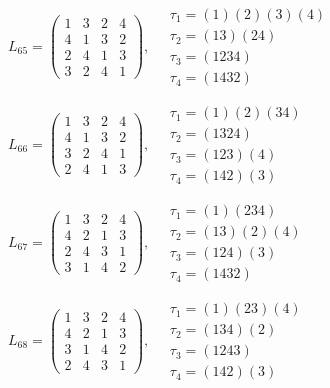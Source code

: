 $L_{65} = \begin{pmatrix} 1 & 3 & 2 & 4 \\ 4 & 1 & 3 & 2 \\ 2 & 4 & 1 & 3 \\ 3 & 2 & 4 & 1 \end{pmatrix}, \quad \begin{matrix} \tau_{1} = (1)(2)(3)(4) \\ \tau_{2} = (1 3)(2 4) \\ \tau_{3} = (1 2 3 4) \\ \tau_{4} = (1 4 3 2) \end{matrix}$

$L_{66} = \begin{pmatrix} 1 & 3 & 2 & 4 \\ 4 & 1 & 3 & 2 \\ 3 & 2 & 4 & 1 \\ 2 & 4 & 1 & 3 \end{pmatrix}, \quad \begin{matrix} \tau_{1} = (1)(2)(3 4) \\ \tau_{2} = (1 3 2 4) \\ \tau_{3} = (1 2 3)(4) \\ \tau_{4} = (1 4 2)(3) \end{matrix}$

$L_{67} = \begin{pmatrix} 1 & 3 & 2 & 4 \\ 4 & 2 & 1 & 3 \\ 2 & 4 & 3 & 1 \\ 3 & 1 & 4 & 2 \end{pmatrix}, \quad \begin{matrix} \tau_{1} = (1)(2 3 4) \\ \tau_{2} = (1 3)(2)(4) \\ \tau_{3} = (1 2 4)(3) \\ \tau_{4} = (1 4 3 2) \end{matrix}$

$L_{68} = \begin{pmatrix} 1 & 3 & 2 & 4 \\ 4 & 2 & 1 & 3 \\ 3 & 1 & 4 & 2 \\ 2 & 4 & 3 & 1 \end{pmatrix}, \quad \begin{matrix} \tau_{1} = (1)(2 3)(4) \\ \tau_{2} = (1 3 4)(2) \\ \tau_{3} = (1 2 4 3) \\ \tau_{4} = (1 4 2)(3) \end{matrix}$

